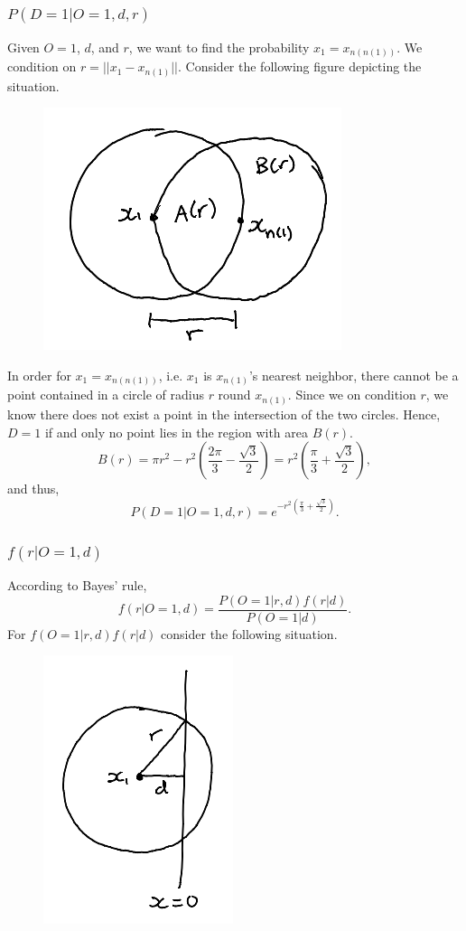 \documentclass{article}
\begin{document}
\subsubsection{$P(D = 1 | O = 1,d,r)$}

Given $O = 1$, $d$, and $r$, we want to find the probability $x_1 = x_{n(n(1))}$. We condition on $r = ||x_1 - x_{n(1)}||$. Consider the following figure depicting the situation.

\begin{figure}[H]
\includegraphics[scale=0.5]{nearest neighbor circles}
\centering
\end{figure}

In order for $x_1 = x_{n(n(1))}$, i.e. $x_1$ is $x_{n(1)}$'s nearest neighbor, there cannot be a point contained in a circle of radius $r$ round $x_{n(1)}$. Since we on condition $r$, we know there does not exist a point in the intersection of the two circles. Hence, $D = 1$ if and only no point lies in the region with area $B(r)$. 
$$B(r) = \pi r^2 - r^2\left(\frac{2\pi}{3} - \frac{\sqrt{3}}{2}\right) = r^2\left(\frac{\pi}{3} + \frac{\sqrt{3}}{2}\right),$$ 
and thus,
$$P(D = 1 | O = 1, d, r) = e^{- r^2\left(\frac{\pi}{3} + \frac{\sqrt{3}}{2}\right)}.$$

\subsubsection{$f(r | O=1,d)$}

According to Bayes' rule,
$$f(r | O=1,d) = \frac{P(O=1 | r,d)f(r | d)}{P(O=1 | d)}.$$
For $f(O=1 | r,d)f(r | d)$ consider the following situation. 

\begin{figure}[H]
\includegraphics[scale=0.5]{d and r known}
\centering
\end{figure}
\end{document}
